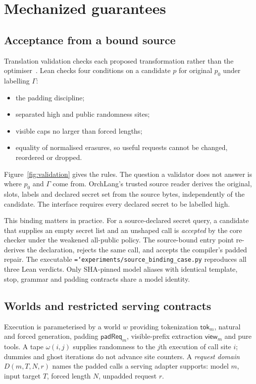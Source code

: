 \documentclass[preprint,12pt]{elsarticle}
\theoremstyle{definition}
\newcommand{\code}[1]{\texttt{\hyphenchar\font=`\-#1}}
\begin{document}
\section{Mechanized guarantees}\label{sec:formal}

\subsection{Acceptance from a bound source}\label{sec:acceptance}

Translation validation checks each proposed transformation rather than the
optimiser~\cite{pnueli1998tv,necula2000tv}. Lean checks four conditions on a
candidate $p$ for original $p_0$ under labelling $\Gamma$:
\begin{itemize}
\item the padding discipline;
\item separated high and public randomness sites;
\item visible caps no larger than forced lengths;
\item equality of normalised erasures, so useful requests cannot be changed,
reordered or dropped.
\end{itemize}
Figure~\ref{fig:validation} gives the rules. The question a validator does not
answer is where $p_0$ and $\Gamma$ come from. OrchLang's trusted source reader
derives the original, slots, labels and declared secret set from the source bytes,
independently of the candidate. The interface requires every declared secret to
be labelled high.

This binding matters in practice. For a source-declared secret query, a
candidate that supplies an empty secret list and an unshaped call is
\emph{accepted} by the core checker under the weakened all-public policy. The
source-bound entry point re-derives the declaration, rejects the same call, and
accepts the compiler's padded repair. The executable
\code{experiments/source\_binding\_case.py} reproduces all three Lean verdicts.
Only SHA-pinned model aliases with identical template, stop, grammar and padding
contracts share a model identity.


\subsection{Worlds and restricted serving contracts}\label{sec:restricted}

Execution is parameterised by a world $w$ providing tokenization
$\mathsf{tok}_m$, natural and forced generation, padding $\mathsf{padReq}_m$,
visible-prefix extraction $\mathsf{view}_m$ and pure tools. A tape $\omega(i,j)$
supplies randomness to the $j$th execution of call site $i$; dummies and ghost
iterations do not advance site counters. A \emph{request domain}
$D(m,T,N,r)$ names the padded calls a serving adapter supports: model $m$,
input target $T$, forced length $N$, unpadded request $r$.
\end{document}
